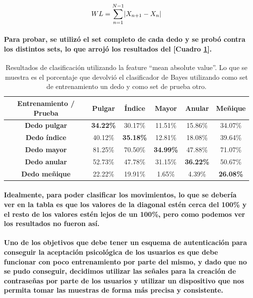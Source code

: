 \documentclass{article}
\DeclarePairedDelimiter\abs{\lvert}{\rvert}%
\begin{document}
\begin{equation}\label{eq:bayes}
WL = \sum_{n=1}^{N-1} \abs{X_{n + 1} - X_n}
\end{equation}

\paragraph{
Para probar, se utilizó el set completo de cada dedo y se probó contra los distintos sets, lo que arrojó los resultados del [Cuadro \ref{table:resultados-clasificador}].
}

\begin{table}[h!]
\centering
\begin{tabular}{ |c|c|c|c|c|c| }
\hline
    \textbf{Entrenamiento / Prueba} & \textbf{Pulgar} & \textbf{Índice} & \textbf{Mayor} & \textbf{Anular} & \textbf{Meñique} \\
\hline
    \textbf{Dedo pulgar} & \textbf{34.22\%} & 30.17\% & 11.51\% & 15.86\% & 34.07\% \\
\hline
    \textbf{Dedo índice} & 40.12\% & \textbf{35.18\%} & 12.81\% & 18.08\% & 39.64\% \\
\hline
    \textbf{Dedo mayor} & 81.25\% & 70.50\% & \textbf{34.99\%} & 47.88\% & 71.07\% \\
\hline
    \textbf{Dedo anular} & 52.73\% & 47.78\% & 31.15\% & \textbf{36.22\%} & 50.67\% \\
\hline
    \textbf{Dedo meñique} & 22.22\% & 19.91\% & 1.65\% & 4.39\% & \textbf{26.08\%} \\
\hline
\end{tabular}
\caption{Resultados de clasificación utilizando la feature ``mean absolute value''. Lo que se muestra es el porcentaje que devolvió el clasificador de Bayes utilizando como set de entrenamiento un dedo y como set de prueba otro.}
\label{table:resultados-clasificador}
\end{table}

\paragraph{
Idealmente, para poder clasificar los movimientos, lo que se debería ver en la tabla es que los valores de la diagonal estén cerca del 100\% y el resto de los valores estén lejos de un 100\%, pero como podemos ver los resultados no fueron así.
}

\paragraph{
Uno de los objetivos que debe tener un esquema de autenticación para conseguir la aceptación psicológica de los usuarios es que debe funcionar con poco entrenamiento por parte del mismo, y dado que no se pudo conseguir, decidimos utilizar las señales para la creación de contraseñas por parte de los usuarios y utilizar un dispositivo que nos permita tomar las muestras de forma más precisa y consistente.
}
\end{document}
